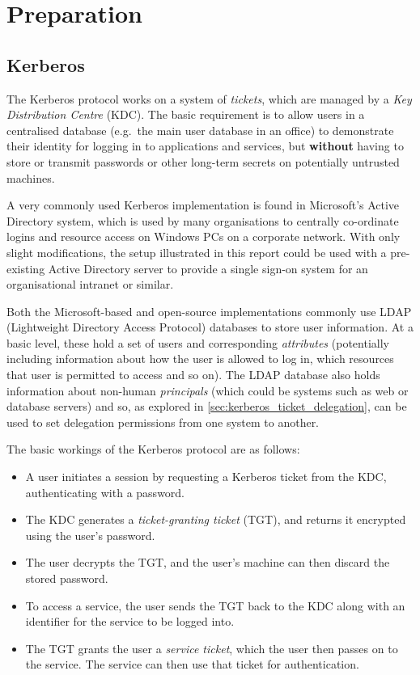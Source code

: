 \documentclass[12pt]{report}
\begin{document}
\chapter{Preparation}

\section{Kerberos}
The Kerberos protocol works on a system of \textit{tickets}, which are managed by a \textit{Key Distribution Centre} (KDC). The basic requirement is to allow users in a centralised database (e.g.\ the main user database in an office) to demonstrate their identity for logging in to applications and services, but \textbf{without} having to store or transmit passwords or other long-term secrets on potentially untrusted machines.

A very commonly used Kerberos implementation is found in Microsoft's Active Directory system, which is used by many organisations to centrally co-ordinate logins and resource access on Windows PCs on a corporate network. With only slight modifications, the setup illustrated in this report could be used with a pre-existing Active Directory server to provide a single sign-on system for an organisational intranet or similar.

Both the Microsoft-based and open-source implementations commonly use LDAP (Lightweight Directory Access Protocol) databases to store user information. At a basic level, these hold a set of users and corresponding \textit{attributes} (potentially including information about how the user is allowed to log in, which resources that user is permitted to access and so on). The LDAP database also holds information about non-human \textit{principals} (which could be systems such as web or database servers) and so, as explored in \autoref{sec:kerberos_ticket_delegation}, can be used to set delegation permissions from one system to another.

The basic workings of the Kerberos protocol are as follows:

\begin{itemize}
\item
  A user initiates a session by requesting a Kerberos ticket from the KDC, authenticating with a password.
\item
  The KDC generates a \textit{ticket-granting ticket} (TGT), and returns it encrypted using the user's password.
\item
  The user decrypts the TGT, and the user's machine can then discard the stored password.
\item
  To access a service, the user sends the TGT back to the KDC along with an identifier for the service to be logged into.
\item
  The TGT grants the user a \textit{service ticket}, which the user then passes on to the service. The service can then use that ticket for authentication.
\end{itemize}
\end{document}
